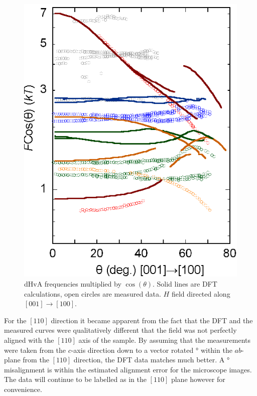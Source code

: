 \begin{figure}
    \begin{center}
        \includegraphics[scale=0.7]{Chapter3-dHvABaFe2P2/Figures/AngleDepMeasurements/AngleSweepMeasuredUnshifted/AngleSweepMeasuredUnshifted}
        \caption{dHvA frequencies multiplied by $\cos(\theta)$. Solid lines are DFT calculations, open circles are measured data. $H$ field directed along $[001]\rightarrow[100]$.}
        \label{Fig:3:AngleSweepMeasuredUnshifted}
    \end{center}
\end{figure}

For the $[110]$ direction it became apparent from the fact that the DFT and the measured curves were qualitatively different that the field was not perfectly aligned with the $[110]$ axis of the sample. By assuming that the measurements were taken from the $c$-axis direction down to a vector rotated \unit[10]{\degree} within the $ab$-plane from the $[110]$ direction, the DFT data matches much better. A \unit[10]{\degree} misalignment is within the estimated alignment error for the microscope images. The data will continue to be labelled as in the $[110]$ plane however for convenience.

